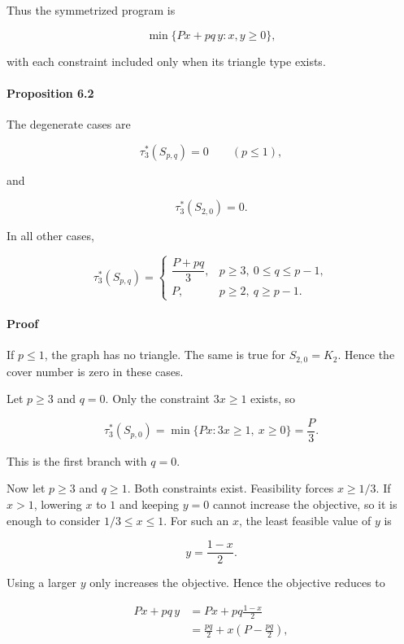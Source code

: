 \documentclass[english,11pt,a4paper]{article}
\begin{document}
Thus the symmetrized program is

\[
\min\{Px+pq\,y:x,y\ge0\},
\]

with each constraint included only when its triangle type exists.

\paragraph{Proposition 6.2}\label{proposition-6.2}

The degenerate cases are

\[
\tau_3^*(S_{p,q})=0
\qquad
(p\le1),
\]

and

\[
\tau_3^*(S_{2,0})=0.
\]

In all other cases,

\[
\boxed{
\tau_3^*(S_{p,q})
=
\begin{cases}
\dfrac{P+pq}{3},
& p\ge3,\ 0\le q\le p-1,\\[3mm]
P,
& p\ge2,\ q\ge p-1.
\end{cases}
}
\]

\paragraph{Proof}\label{proof-9}

If \(p\le1\), the graph has no triangle. The same is true for
\(S_{2,0}=K_2\). Hence the cover number is zero in these cases.

Let \(p\ge3\) and \(q=0\). Only the constraint \(3x\ge1\) exists, so

\[
\tau_3^*(S_{p,0})
=
\min\{Px:3x\ge1,\ x\ge0\}
=
\frac P3.
\]

This is the first branch with \(q=0\).

Now let \(p\ge3\) and \(q\ge1\). Both constraints exist. Feasibility
forces \(x\ge1/3\). If \(x>1\), lowering \(x\) to \(1\) and keeping
\(y=0\) cannot increase the objective, so it is enough to consider
\(1/3\le x\le1\). For such an \(x\), the least feasible value of \(y\)
is

\[
y=\frac{1-x}{2}.
\]

Using a larger \(y\) only increases the objective. Hence the objective
reduces to

\[
\begin{aligned}
Px+pq\,y
&=
Px+pq\frac{1-x}{2}\\
&=
\frac{pq}{2}
+
x\left(P-\frac{pq}{2}\right),
\end{aligned}
\]
\end{document}
